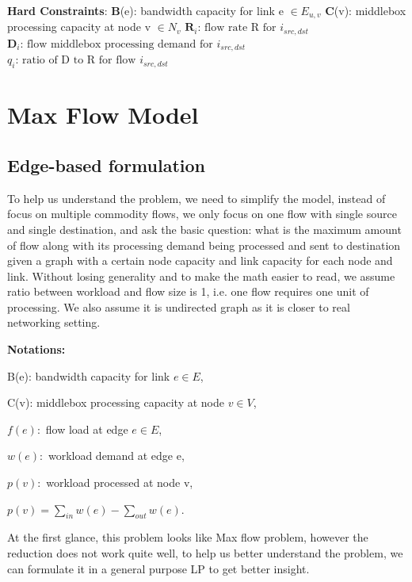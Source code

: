 \documentclass[twoside,leqno, 11pt]{article}
\begin{document}
\textbf{Hard Constraints}:
\newline
\textbf{B}(e): bandwidth capacity for link e $\in E_{u,v}$
 \newline
\textbf{C}(v): middlebox processing capacity at node v $\in N_{v}$
 \newline
$ \boldsymbol{R}_{i} \text{: flow rate R for } i_{src, dst}$ 
\newline
$ \boldsymbol{D}_{i} \text{: flow middlebox processing demand for } i_{src, dst}$
\newline 
$ q_{i} \text{: ratio of D to R for flow } i_{src, dst}$ 
\section{Max Flow Model}
\subsection{Edge-based formulation}To help us understand the problem, we need to simplify the model, instead of focus on multiple commodity flows, we only focus on one flow with single source and single destination, and ask the basic question: what is the maximum amount of flow along with its processing demand being processed and sent to destination given a graph with a certain node capacity and link capacity for each node and link. Without losing generality and to make the math easier to read, we assume ratio between workload and flow size is 1, i.e. one flow requires one unit of processing. We also assume it is undirected graph as it is closer to real networking setting. %

\textbf{Notations:}

B(e): bandwidth capacity for link $e \in E$,

C(v): middlebox processing capacity at node $v \in V$,

$ f(e): $  flow load at edge $e\in E $, 

$ w(e):$ workload demand at edge e, 

$p(v): $   workload processed at node v,

$p(v) = \sum\limits_{in } w(e) - \sum\limits_{out} w(e)  $. 
 
 At the first glance, this problem looks like Max flow problem, however the reduction does not work quite well, to help us better understand the problem, we can formulate it in a general purpose LP to get better insight.
\end{document}
